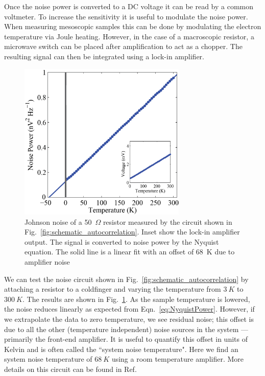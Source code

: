 Once the noise power is converted to a DC voltage it can be read by a common voltmeter. To increase the sensitivity it is useful to modulate the noise power. When measuring mesoscopic samples this can be done by modulating the electron temperature via Joule heating. However, in the case of a macroscopic resistor, a microwave switch can be placed after amplification to act as a chopper. The resulting signal can then be integrated using a lock-in amplifier.
\begin{figure}
\centering
\includegraphics[width = 80mm]{figures/Johnson_noise_thermometry/Auto_noise_vs_T.png}
\caption{Johnson noise of a 50~$\Omega$ resistor measured by the circuit shown in Fig.~\ref{fig:schematic_autocorrelation}. Inset show the lock-in amplifier output. The signal is converted to noise power by the Nyquist equation. The solid line is a linear fit with an offset of 68~K due to amplifier noise}
\label{fig:auto_noise_vs_T}
\end{figure}

We can test the noise circuit shown in Fig.~\ref{fig:schematic_autocorrelation} by attaching a resistor to a coldfinger and varying the temperature from $3~K$ to $300~K$. The results are shown in Fig.~\ref{fig:auto_noise_vs_T}. As the sample temperature is lowered, the noise reduces linearly as expected from Eqn.~\ref{eq:NyquistPower}. However, if we extrapolate the data to zero temperature, we see residual noise; this offset is due to all the other (temperature independent) noise sources in the system --- primarily the front-end amplifier. It is useful to quantify this offset in units of Kelvin and is often called the ``system noise temperature". Here we find an system noise temperature of $68~K$ using a room temperature amplifier.
More details on this circuit can be found in Ref.~\cite{crossno_development_2015}

